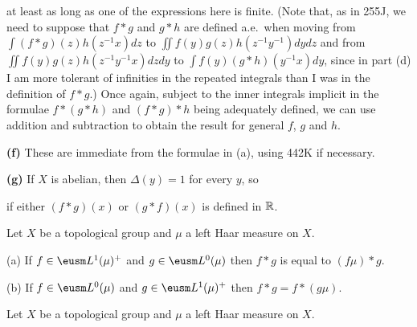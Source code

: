 {\noindent at least as long as one of the expressions here is finite.
(Note that, as in 255J, we need to suppose that $f*g$ and $g*h$ are
defined a.e.\ when moving from
$\int(f*g)(z)h(z^{-1}x)dz$ to $\iint f(y)g(z)h(z^{-1}y^{-1})dydz$ and
from $\iint f(y)g(z)h(z^{-1}y^{-1}x)dzdy$ to
$\int f(y)(g*h)(y^{-1}x)dy$, since in part (d) I am more tolerant
of infinities in the repeated integrals than I was in the definition of
$f*g$.)   Once again, subject to the inner integrals implicit in the
formulae $f*(g*h)$ and $(f*g)*h$ being adequately defined, we can
use addition and subtraction to obtain the result for general $f$, $g$
and $h$.

\medskip

{\bf (f)} These are immediate from the formulae in (a), using 442K if
necessary.

\medskip

{\bf (g)} If $X$ is abelian, then $\Delta(y)=1$ for every $y$, so


\noindent if either $(f*g)(x)$ or $(g*f)(x)$ is defined in $\Bbb R$.
}%

 Let $X$ be a topological group and $\mu$ a
left Haar measure on $X$.

(a) If $f\in\eusm L^1(\mu)^+$ and $g\in\eusm L^0(\mu)$ then
$f*g$ is equal to $(f\mu)*g$.

(b) If $f\in\eusm L^0(\mu)$ and $g\in\eusm L^1(\mu)^+$ then
$f*g=f*(g\mu)$.


 Let $X$ be a topological group and $\mu$ a
left Haar measure on $X$.

